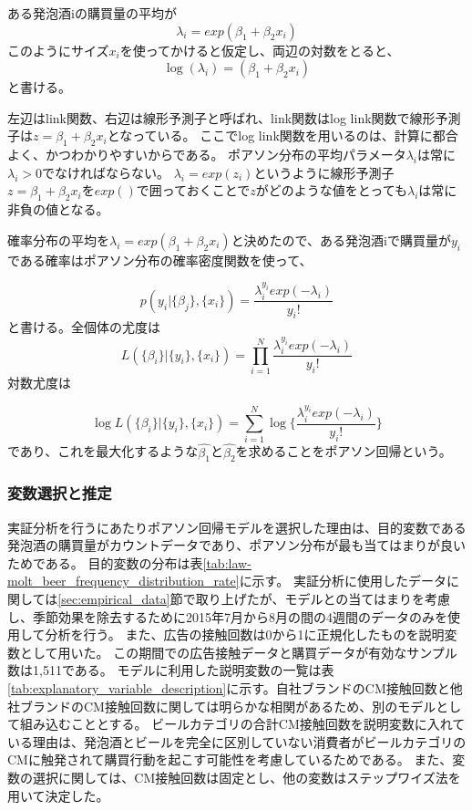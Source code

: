 \documentclass[11pt]{jsarticle}
\begin{document}
ある発泡酒iの購買量の平均が
\begin{equation}
 \lambda_{i} = exp(\beta_{1} + \beta_{2}x_{i})
\end{equation}
このようにサイズ$x_{i}$を使ってかけると仮定し、両辺の対数をとると、
\begin{equation}
 \log (\lambda_{i}) = (\beta_{1} + \beta_{2}x_{i})
 \end{equation}
と書ける。

左辺はlink関数、右辺は線形予測子と呼ばれ、link関数はlog link関数で線形予測子は$z = \beta_{1} + \beta_{2}x_{i}$となっている。
ここでlog link関数を用いるのは、計算に都合よく、かつわかりやすいからである。
ポアソン分布の平均パラメータ$\lambda_{i}$は常に$\lambda_{i} > 0$でなければならない。
$\lambda_{i} = exp(z_{i})$というように線形予測子$z = \beta_{1} + \beta_{2}x_{i}$を$exp()$で囲っておくことで$z$がどのような値をとっても$\lambda_{i}$は常に非負の値となる。

確率分布の平均を$\lambda_{i} = exp(\beta_{1} + \beta_{2}x_{i})$と決めたので、ある発泡酒iで購買量が$y_{i}$である確率はポアソン分布の確率密度関数を使って、

\begin{equation}
 p(y_{i}|\{\beta_{j}\}, \{x_{i}\}) = \frac{\lambda^{y_{i}}_{i}exp(-\lambda_{i})}{y_{i}!}
\end{equation}
と書ける。全個体の尤度は
\begin{equation}
 L( \{ \beta_{i} \} | \{y_{i} \}, \{ x_{i} \} ) = \prod_{i = 1}^{N} \frac{\lambda^{y_{i}}_{i}exp(-\lambda_{i})}{y_{i}!}
\end{equation}
対数尤度は

\begin{equation}
 \log L( \{ \beta_{i} \} | \{y_{i} \}, \{ x_{i} \} ) = \sum_{i = 1}^{N} \log \{ \frac{\lambda^{y_{i}}_{i}exp(-\lambda_{i})}{y_{i}!} \}
\end{equation}
であり、これを最大化するような$\hat{\beta_{1}}$と$\hat{\beta_{2}}$を求めることをポアソン回帰という。


\subsubsection{変数選択と推定}
\label{subsec:poisson_variable}
実証分析を行うにあたりポアソン回帰モデルを選択した理由は、目的変数である発泡酒の購買量がカウントデータであり、ポアソン分布が最も当てはまりが良いためである。
目的変数の分布は表\ref{tab:law-molt_beer_frequency_distribution_rate}に示す。
実証分析に使用したデータに関しては\ref{sec:empirical_data}節で取り上げたが、モデルとの当てはまりを考慮し、季節効果を除去するために2015年7月から8月の間の4週間のデータのみを使用して分析を行う。
また、広告の接触回数は0から1に正規化したものを説明変数として用いた。
この期間での広告接触データと購買データが有効なサンプル数は1,511である。
モデルに利用した説明変数の一覧は表\ref{tab:explanatory_variable_description}に示す。自社ブランドのCM接触回数と他社ブランドのCM接触回数に関しては明らかな相関があるため、別のモデルとして組み込むこととする。
ビールカテゴリの合計CM接触回数を説明変数に入れている理由は、発泡酒とビールを完全に区別していない消費者がビールカテゴリのCMに触発されて購買行動を起こす可能性を考慮しているためである。
また、変数の選択に関しては、CM接触回数は固定とし、他の変数はステップワイズ法を用いて決定した。
\end{document}
